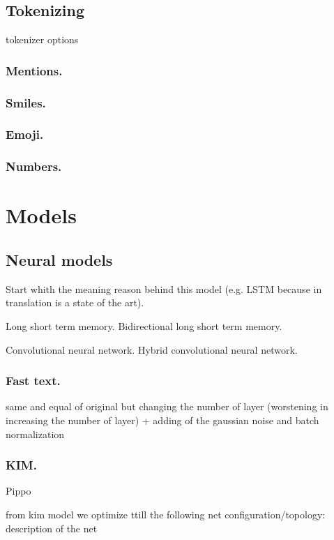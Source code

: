 \subsection{Tokenizing}

tokenizer options

\subsubsection{Mentions.}
\subsubsection{Smiles.}
\subsubsection{Emoji.}
\subsubsection{Numbers.}


\section{Models}

 	

\subsection{Neural models}

Start whith the meaning reason behind this model (e.g. LSTM because in translation is a state of the art).

Long short term memory.
Bidirectional long short term memory.

Convolutional neural network.
Hybrid convolutional neural network.

\subsubsection{Fast text.}

same and equal of original but changing the number of layer  (worstening in increasing the number of layer) + adding of the gaussian noise and batch normalization

\subsubsection{KIM.}

Pippo \cite{kim2014convolutional}



from kim model we optimize ttill the following net configuration/topology: description of the net
